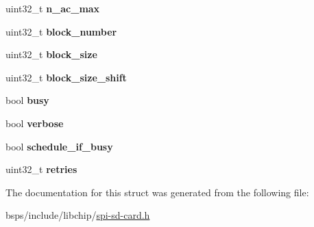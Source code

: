 \begin{DoxyCompactItemize}
uint32\+\_\+t {\bfseries n\+\_\+ac\+\_\+max}
\item 
\mbox{\label{structsd__card__driver__entry_ab59baeb4c8e426b76c8f6e5a73e91a9a}} 
uint32\+\_\+t {\bfseries block\+\_\+number}
\item 
\mbox{\label{structsd__card__driver__entry_a1e3d646351b0c0785a0a30778ea5b1cd}} 
uint32\+\_\+t {\bfseries block\+\_\+size}
\item 
\mbox{\label{structsd__card__driver__entry_a797009040ef2191e9554147ccbc0f18e}} 
uint32\+\_\+t {\bfseries block\+\_\+size\+\_\+shift}
\item 
\mbox{\label{structsd__card__driver__entry_a3d44b2bb6388ad830d51f37d5f881abb}} 
bool {\bfseries busy}
\item 
\mbox{\label{structsd__card__driver__entry_aa793d833e299026252bd161aa942eaea}} 
bool {\bfseries verbose}
\item 
\mbox{\label{structsd__card__driver__entry_aa6af363d243ca679d26d7acf80d7f86a}} 
bool {\bfseries schedule\+\_\+if\+\_\+busy}
\item 
\mbox{\label{structsd__card__driver__entry_a803c297adec994dad9dcd2ee3ea7c6c3}} 
uint32\+\_\+t {\bfseries retries}
\end{DoxyCompactItemize}


The documentation for this struct was generated from the following file\+:\begin{DoxyCompactItemize}
\item 
bsps/include/libchip/\mbox{\hyperlink{spi-sd-card_8h}{spi-\/sd-\/card.\+h}}\end{DoxyCompactItemize}
